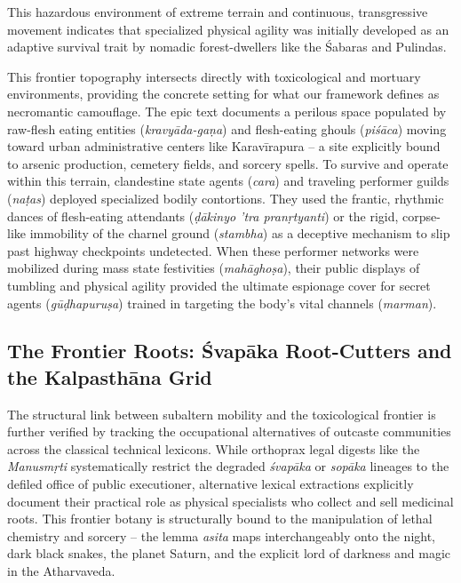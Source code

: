 \documentclass[11pt,twoside,letterpaper]{article}
\begin{document}
This hazardous environment of extreme terrain and continuous, transgressive movement indicates that specialized physical agility was initially developed as an adaptive survival trait by nomadic forest-dwellers like the Śabaras and Pulindas.

This frontier topography intersects directly with toxicological and mortuary environments, providing the concrete setting for what our framework defines as necromantic camouflage. The epic text documents a perilous space populated by raw-flesh eating entities (\textit{kravyāda-gaṇa}) and flesh-eating ghouls (\textit{piśāca}) moving toward urban administrative centers like Karavīrapura – a site explicitly bound to arsenic production, cemetery fields, and sorcery spells. To survive and operate within this terrain, clandestine state agents (\textit{cara}) and traveling performer guilds (\textit{naṭas}) deployed specialized bodily contortions. They used the frantic, rhythmic dances of flesh-eating attendants (\textit{ḍākinyo ’tra pranṛtyanti}) or the rigid, corpse-like immobility of the charnel ground (\textit{stambha}) as a deceptive mechanism to slip past highway checkpoints undetected. When these performer networks were mobilized during mass state festivities (\textit{mahāghoṣa}), their public displays of tumbling and physical agility provided the ultimate espionage cover for secret agents (\textit{gūḍhapuruṣa}) trained in targeting the body’s vital channels (\textit{marman}).

\subsection{The Frontier Roots: Śvapāka Root-Cutters and the Kalpasthāna Grid}
The structural link between subaltern mobility and the toxicological frontier is further verified by tracking the occupational alternatives of outcaste communities across the classical technical lexicons. While orthoprax legal digests like the \textit{Manusmṛti} systematically restrict the degraded \textit{śvapāka} or \textit{sopāka} lineages to the defiled office of public executioner, alternative lexical extractions explicitly document their practical role as physical specialists who collect and sell medicinal roots. This frontier botany is structurally bound to the manipulation of lethal chemistry and sorcery – the lemma \textit{asita} maps interchangeably onto the night, dark black snakes, the planet Saturn, and the explicit lord of darkness and magic in the Atharvaveda.
\end{document}
